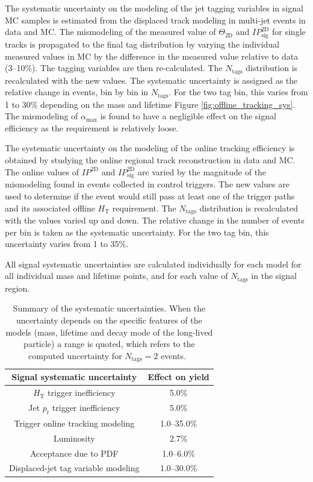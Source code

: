 The systematic uncertainty on the modeling of the jet tagging
variables in signal MC samples is estimated from the displaced track
modeling in multi-jet events in data and MC. The mismodeling of the
measured value of $\Theta_{\textrm{2D}}$ and $IP_{\textrm{sig}}^{\textrm{2D}}$ for
single tracks is propagated to the final tag distribution by varying
the individual measured values in MC by the difference in the measured
value relative to data (3--10\%). The tagging variables are then
re-calculated.  The $N_{\textrm{tags}}$ distribution is recalculated
with the new values. The systematic uncertainty is assigned as the
relative change in events, bin by bin in $N_{\textrm{tags}}$. For the
two tag bin, this varies from 1 to 30\% depending on the mass and
lifetime Figure \ref{fig:offline_tracking_sys}. The mismodeling of
 $\alpha_{\textrm{max}}$ is found to have a negligible effect on the
 signal efficiency as the requirement is relatively loose.

The systematic uncertainty on the modeling of the online tracking
efficiency is obtained by studying the online regional track
reconstruction in data and MC. The online values of $IP^{\textrm{2D}}$
and $IP^{\textrm{2D}}_{\textrm{sig}}$ are varied by the magnitude of
the mismodeling found in events collected in control triggers.  The
new values are used to determine if the event would still pass at
least one of the trigger paths and its associated offline
$H_{\textrm{T}}$ requirement. The $N_{\textrm{tags}}$ distribution is
recalculated with the values varied up and down. The relative change
in the number of events per bin is taken as the systematic
uncertainty. For the two tag bin, this uncertainty varies from
1 to 35\%.

All signal systematic uncertainties are calculated individually for
each model for all individual mass and lifetime points, and for each
value of $N_\text{tags}$ in the signal region.



\begin{table}[tb]
  \caption{Summary of the systematic uncertainties. 
    When the uncertainty depends on the specific features of the models
    (mass, lifetime and decay mode of the long-lived particle) a
    range is quoted, which refers to the computed uncertainty for $N_{\textrm{tags}}=2$ events.~\label{tab:sigSys}}
\begin{center}
\begin{tabular}{cc}
\textbf{Signal systematic uncertainty} & \textbf{Effect on yield} \\
\hline
$H_{\textrm{T}}$ trigger inefficiency &  5.0\% \\
Jet $p_{t}$ trigger inefficiency  & 5.0\% \\
Trigger online tracking modeling & 1.0--35.0\% \\
Luminosity & 2.7\% \\
Acceptance due to PDF & 1.0--6.0\% \\
Displaced-jet tag variable modeling & 1.0--30.0\% \\
\end{tabular}
\end{center}
\end{table}

